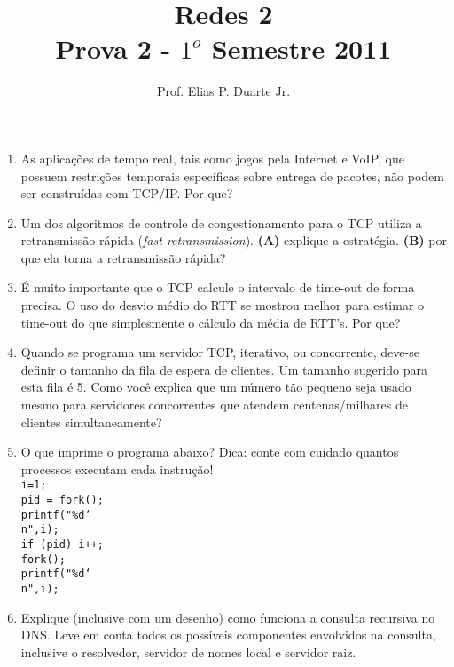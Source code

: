 \documentclass[a4paper,11pt]{article}
\date{ }
\begin{document}
\title{
Redes 2\\
Prova 2 - $1^o$ Semestre 2011
}

\author {
Prof. Elias P. Duarte Jr.
}

\maketitle

\begin{enumerate}

\item As aplicações de tempo real, tais como jogos pela Internet e VoIP, que
possuem restrições temporais específicas sobre entrega de pacotes, não podem ser
construídas com TCP/IP. Por que?

\item Um dos algoritmos de controle de congestionamento para o TCP utiliza a
retransmissão rápida (\textit{fast retransmission}). \textbf{(A)} explique a
estratégia. \textbf{(B)} por que ela torna a retransmissão rápida?

\item É muito importante que o TCP calcule o intervalo de time-out de forma
precisa. O uso do desvio médio do RTT se mostrou melhor para estimar o time-out
do que simplesmente o cálculo da média de RTT's. Por que?

\item Quando se programa um servidor TCP, iterativo, ou concorrente, deve-se
definir o tamanho da fila de espera de clientes. Um tamanho sugerido para esta
fila é 5. Como você explica que um número tão pequeno seja usado mesmo para
servidores concorrentes que atendem centenas/milhares de clientes
simultaneamente?

\item O que imprime o programa abaixo? Dica: conte com cuidado quantos processos
executam cada instrução!
\\

\texttt{i=1;\\
pid = fork();\\
printf("\%d\char`\\n",i);\\
if (pid) i++;\\
fork();\\
printf("\%d\char`\\n",i);\\
}

\item Explique (inclusive com um desenho) como funciona a consulta recursiva no
DNS. Leve em conta todos os possíveis componentes envolvidos na consulta,
inclusive o resolvedor, servidor de nomes local e servidor raiz.


\end{enumerate}
\end{document}
